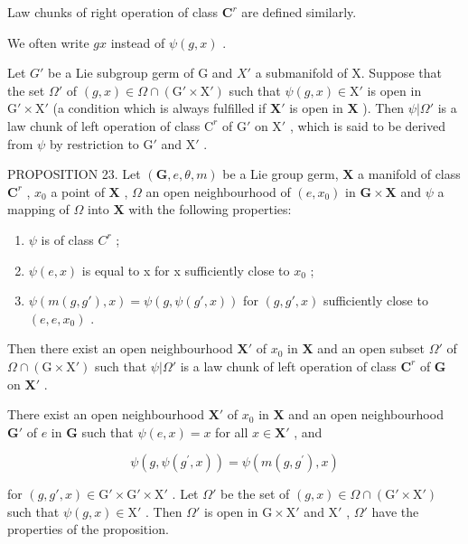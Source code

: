 Law chunks of right operation of class \(\mathbf{C}^r\) are defined similarly.

We often write \(gx\) instead of \(\psi(g, x)\) .

Let \(G'\) be a Lie subgroup germ of G and \(X'\) a submanifold of X. Suppose that the set \(\Omega'\) of \((g,x)\in \Omega \cap (\mathrm{G}'\times \mathrm{X}')\) such that \(\psi (g,x)\in \mathrm{X}'\) is open in \(\mathrm{G}'\times \mathrm{X}'\) (a condition which is always fulfilled if \(\mathbf{X}'\) is open in \(\mathbf{X}\) ). Then \(\psi |\Omega '\) is a law chunk of left operation of class \(\mathrm{C}^r\) of \(\mathrm{G}'\) on \(\mathrm{X}'\) , which is said to be derived from \(\psi\) by restriction to \(\mathrm{G}'\) and \(\mathrm{X}'\) .

PROPOSITION 23. Let \((\mathbf{G}, e, \theta, m)\) be a Lie group germ, \(\mathbf{X}\) a manifold of class \(\mathbf{C}^r\) , \(x_0\) a point of \(\mathbf{X}\) , \(\Omega\) an open neighbourhood of \((e, x_0)\) in \(\mathbf{G} \times \mathbf{X}\) and \(\psi\) a mapping of \(\Omega\) into \(\mathbf{X}\) with the following properties:

\begin{enumerate}
\def\labelenumi{(\roman{enumi})}
\item
  \(\psi\) is of class \(C^{r}\) ;
\item
  \(\psi(e, x)\) is equal to x for x sufficiently close to \(x_{0}\) ;
\item
  \(\psi(m(g, g'), x) = \psi(g, \psi(g', x))\) for \((g, g', x)\) sufficiently close to \((e, e, x_0)\) .
\end{enumerate}

Then there exist an open neighbourhood \(\mathbf{X}'\) of \(x_0\) in \(\mathbf{X}\) and an open subset \(\Omega'\) of \(\Omega \cap (\mathrm{G} \times \mathrm{X}')\) such that \(\psi|\Omega'\) is a law chunk of left operation of class \(\mathbf{C}^r\) of \(\mathbf{G}\) on \(\mathbf{X}'\) .

There exist an open neighbourhood \(\mathbf{X}'\) of \(x_0\) in \(\mathbf{X}\) and an open neighbourhood \(\mathbf{G}'\) of \(e\) in \(\mathbf{G}\) such that \(\psi(e, x) = x\) for all \(x \in \mathbf{X}'\) , and

\[
\psi (g, \psi (g ^ {\prime}, x)) = \psi (m (g, g ^ {\prime}), x)
\]

for \((g, g', x) \in \mathrm{G}' \times \mathrm{G}' \times \mathrm{X}'\) . Let \(\Omega'\) be the set of \((g, x) \in \Omega \cap (\mathrm{G}' \times \mathrm{X}')\) such that \(\psi(g, x) \in \mathrm{X}'\) . Then \(\Omega'\) is open in \(\mathrm{G} \times \mathrm{X}'\) and \(\mathrm{X}'\) , \(\Omega'\) have the properties of the proposition.

